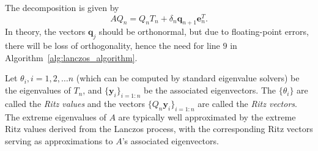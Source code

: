 The decomposition is given by
\begin{equation}\label{eq:Lanczos_Decomposition}
	AQ_n = Q_nT_n + \delta_{n}\mathbf{q}_{n+1}\mathbf{e}_n^T.
\end{equation}
In theory, the vectors $\mathbf{q}_j$ should be orthonormal, but due to floating-point errors, there will be loss of orthogonality, hence the need for line $9$ in Algorithm~\ref{alg:lanczos_algorithm}.

Let $\theta_i, i = 1,2, \ldots n$ (which can be computed by standard eigenvalue solvers) be the eigenvalues of $T_n$, and $\{\mathbf{y}_i\}_{i = 1 : n}$ be the associated eigenvectors. The $\{\theta_i\}$ are called the \textit{Ritz values} and the vectors $\{Q_n\mathbf{y}_i\}_{i = 1 : n}$ are called the \textit{Ritz vectors}. The extreme eigenvalues of $A$ are typically well approximated by the extreme Ritz values derived from the Lanczos process, with the corresponding Ritz vectors serving as approximations to $A$'s associated eigenvectors.

